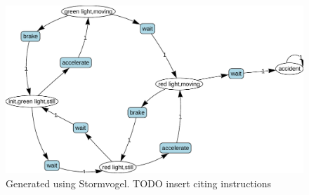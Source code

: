 \documentclass{article}
\begin{document}
            \begin{figure}[h!]
            \centering
            \includegraphics[width=\textwidth]{example.pdf}
            \caption{Generated using Stormvogel. TODO insert citing instructions}
            \end{figure}
            
\end{document}
